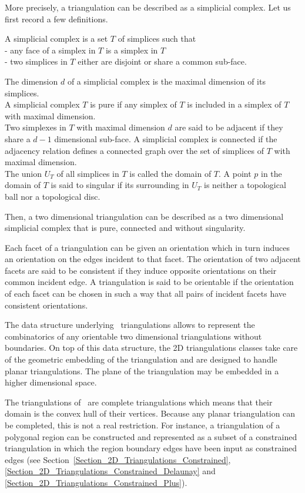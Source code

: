 More precisely, a triangulation can be described 
as a simplicial complex.
Let us first record a few definitions.

A simplicial complex is a set $T$  of simplices such that~\\
- any face of a simplex in $T$ is a simplex in $T$ \\
- two simplices in $T$  either are disjoint or  share
  a common sub-face.

The dimension $d$ of a  simplicial complex is the 
maximal dimension of its simplices. \\
A simplicial complex $T$ is pure if any simplex of $T$
is included in a simplex of $T$ with maximal dimension. \\
Two simplexes in $T$ with maximal dimension $d$ are said to be
adjacent if they share a $d-1$ dimensional sub-face.
A simplicial complex is connected if the adjacency relation
defines a connected graph 
over  the set of simplices of $T$ with maximal dimension. \\
The union $U_T$ of all simplices in $T$ is called the domain of $T$.
A point $p$ in the domain of $T$ is said to singular 
if its surrounding in $U_T$
is neither a topological ball nor a topological disc.

Then, a two dimensional triangulation can be described as a 
two dimensional simplicial complex  that is pure,
connected and without singularity.

Each facet of a triangulation can be given an orientation
which in turn induces an orientation
on the edges incident to that facet. The orientation of two adjacent
facets are said to be consistent if they induce
opposite orientations on their common incident edge.
A triangulation is said to be orientable if 
the orientation of each facet can be chosen in such a way
that all pairs of incident facets have consistent orientations. 

The data structure underlying \cgal\ triangulations
allows to represent the combinatorics of 
any  orientable two dimensional  triangulations
without boundaries. 
On top of this data structure, the 2D triangulations classes
take care of the geometric embedding  of the triangulation
and are designed to handle planar triangulations.
The plane of the triangulation may be embedded in a higher
dimensional space.

The  triangulations of  \cgal\ are complete triangulations
which means  that their domain is  the
convex hull of  their vertices.
Because any planar triangulation
can be completed, this is not a real restriction.
For instance, a triangulation of a  polygonal region can be
constructed  and represented as a subset  of a constrained triangulation 
in which  the region boundary edges have been input as 
constrained edges (see
Section~\ref{Section_2D_Triangulations_Constrained},
\ref{Section_2D_Triangulations_Constrained_Delaunay} and 
\ref{Section_2D_Triangulations_Constrained_Plus}).

